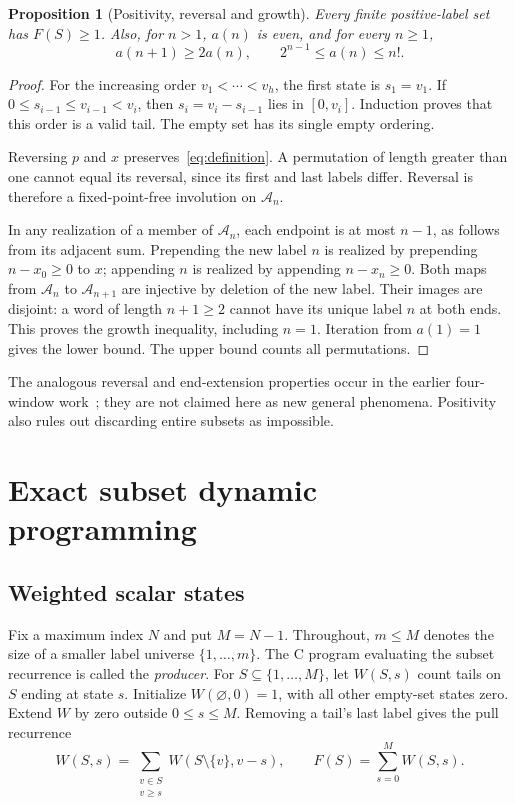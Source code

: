 \documentclass[11pt]{article}
\newtheorem{proposition}[theorem]{Proposition}
\theoremstyle{definition}
\theoremstyle{remark}
\newcommand{\An}{\mathcal A_n}
\begin{document}
\begin{proposition}[Positivity, reversal and growth]
\label{prop:growth}
Every finite positive-label set has $F(S)\geq1$. Also, for $n>1$, $a(n)$
is even, and for every $n\geq1$,
\begin{equation}
 a(n+1)\geq2a(n),\qquad 2^{n-1}\leq a(n)\leq n!.
 \label{eq:bounds}
\end{equation}
\end{proposition}
\begin{proof}
For the increasing order $v_1<\cdots<v_h$, the first state is
$s_1=v_1$. If $0\leq s_{i-1}\leq v_{i-1}<v_i$, then
$s_i=v_i-s_{i-1}$ lies in $[0,v_i]$. Induction proves that this order
is a valid tail. The empty set has its single empty ordering.

Reversing $p$ and $x$ preserves~\eqref{eq:definition}. A permutation of
length greater than one cannot equal its reversal, since its first and last
labels differ. Reversal is therefore a fixed-point-free involution on $\An$.

In any realization of a member of $\An$, each endpoint is at most $n-1$,
as follows from its adjacent sum. Prepending the new label $n$ is realized
by prepending $n-x_0\geq0$ to $x$; appending $n$ is realized by appending
$n-x_n\geq0$. Both maps from $\An$ to $\mathcal A_{n+1}$ are injective
by deletion of the new label. Their images are disjoint: a word of length
$n+1\geq2$ cannot have its unique label $n$ at both ends.
This proves the growth inequality, including $n=1$. Iteration from
$a(1)=1$ gives the lower bound. The upper bound counts all permutations.
\end{proof}

The analogous reversal and end-extension properties occur in the earlier
four-window work~\cite{four}; they are not claimed here as new general
phenomena. Positivity also rules out discarding entire subsets as impossible.

\section{Exact subset dynamic programming}
\label{sec:producer}

\subsection{Weighted scalar states}

Fix a maximum index $N$ and put $M=N-1$. Throughout, $m\leq M$ denotes
the size of a smaller label universe $\{1,\ldots,m\}$. The C program
evaluating the subset recurrence is called the \emph{producer}. For
$S\subseteq\{1,\ldots,M\}$, let $W(S,s)$ count tails on $S$ ending at
state $s$. Initialize $W(\varnothing,0)=1$, with all other empty-set
states zero. Extend $W$ by zero outside $0\leq s\leq M$. Removing a
tail's last label gives the pull recurrence
\begin{equation}
 W(S,s)=\sum_{\substack{v\in S\\v\geq s}}W(S\setminus\{v\},v-s),
 \qquad F(S)=\sum_{s=0}^{M}W(S,s).
 \label{eq:dp}
\end{equation}
\end{document}
